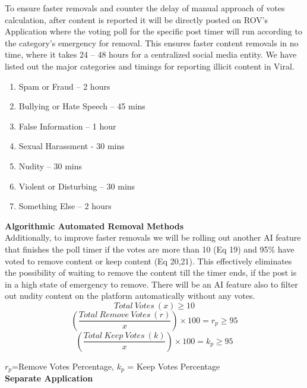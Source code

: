 \documentclass[10pt]{article}
\begin{document}
To ensure faster removals and counter the delay of manual approach of votes calculation, after content is reported it will be directly posted on ROV’s Application where the voting poll for the specific post timer will run according to the category’s emergency for removal. This ensures faster content removals in no time, where it takes 24 – 48 hours for a centralized social media entity. We have listed out the major categories and timings for reporting illicit content in Viral.

\begin{enumerate}[leftmargin=+0.2in]
\item Spam or Fraud – 2 hours
\item Bullying or Hate Speech – 45 mins
\item False Information – 1 hour
\item Sexual Harassment - 30 mins
\item Nudity – 30 mins
\item Violent or Disturbing – 30 mins
\item Something Else – 2 hours
\end{enumerate}

\textbf{Algorithmic Automated Removal Methods}\\

Additionally, to improve faster removals we will be rolling out another AI feature that finishes the poll timer if the votes are more than 10 (Eq 19) and 95\% have voted to remove content or keep content (Eq 20,21). This effectively eliminates the possibility of waiting to remove the content till the timer ends, if the post is in a high state of emergency to remove. There will be an AI feature also to filter out nudity content on the platform automatically without any votes.\\

\begin{equation}
Total\:Votes\:(x) \geq10
\end{equation}
\begin{equation}
(\frac{Total\:Remove\:Votes\:(r)}{x}) \times  100 = r_p \geq 95
\end{equation}
\begin{equation}
(\frac{Total\:Keep\:Votes\:(k)}{x}) \times  100 = k_p \geq 95
\end{equation}

$r_p$=Remove Votes Percentage, $k_p$ = Keep Votes Percentage\\

\textbf{Separate Application}\\
\end{document}
